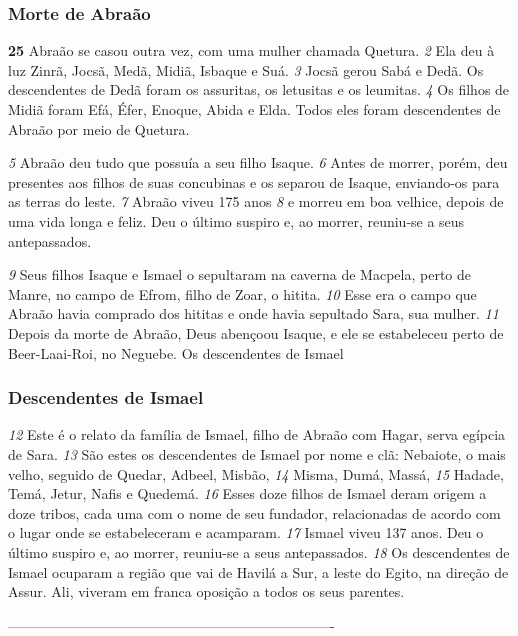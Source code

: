 \bigskip   
\subsubsection*{Morte de Abraão}
\textbf{\large 25}
 Abraão se casou outra vez, com uma mulher chamada Quetura. 
\textit{\tiny 2}
Ela deu à
luz Zinrã, Jocsã, Medã, Midiã, Isbaque e Suá. 
\textit{\tiny 3}
Jocsã gerou Sabá e Dedã. Os
descendentes de Dedã foram os assuritas, os letusitas e os leumitas. 
\textit{\tiny 4}
Os filhos de
Midiã foram Efá, Éfer, Enoque, Abida e Elda. Todos eles foram descendentes de
Abraão por meio de Quetura.

\bigskip   
\textit{\tiny 5}
Abraão deu tudo que possuía a seu filho Isaque. 
\textit{\tiny 6}
Antes de morrer, porém, deu
presentes aos filhos de suas concubinas e os separou de Isaque, enviando-os para
as terras do leste.
\textit{\tiny 7}
Abraão viveu 175 anos 
\textit{\tiny 8}
e morreu em boa velhice, depois de uma vida longa e
feliz. Deu o último suspiro e, ao morrer, reuniu-se a seus antepassados. 

\bigskip   
\textit{\tiny 9}
Seus
filhos Isaque e Ismael o sepultaram na caverna de Macpela, perto de Manre, no
campo de Efrom, filho de Zoar, o hitita. 
\textit{\tiny 10}
Esse era o campo que Abraão havia
comprado dos hititas e onde havia sepultado Sara, sua mulher. 
\textit{\tiny 11}
Depois da morte
de Abraão, Deus abençoou Isaque, e ele se estabeleceu perto de Beer-Laai-Roi, no
Neguebe.
Os descendentes de Ismael

\bigskip
\subsubsection*{Descendentes de Ismael}
\textit{\tiny 12}
Este é o relato da família de Ismael, filho de Abraão com Hagar, serva egípcia de
Sara. 
\textit{\tiny 13}
São estes os descendentes de Ismael por nome e clã: Nebaiote, o mais
velho, seguido de Quedar, Adbeel, Misbão, 
\textit{\tiny 14}
Misma, Dumá, Massá, 
\textit{\tiny 15}
Hadade,
Temá, Jetur, Nafis e Quedemá. 
\textit{\tiny 16}
Esses doze filhos de Ismael deram origem a doze
tribos, cada uma com o nome de seu fundador, relacionadas de acordo com o
lugar onde se estabeleceram e acamparam. 
\textit{\tiny 17}
Ismael viveu 137 anos. Deu o último
suspiro e, ao morrer, reuniu-se a seus antepassados. 
\textit{\tiny 18}
Os descendentes de Ismael
ocuparam a região que vai de Havilá a Sur, a leste do Egito, na direção de Assur.
Ali, viveram em franca oposição a todos os seus parentes.

----------------------------------------------------------------------

